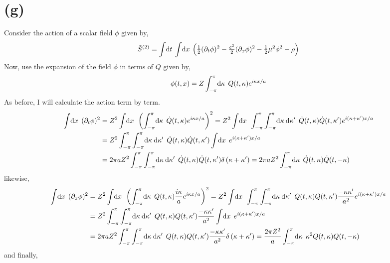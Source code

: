 \documentclass[12pt]{extarticle}
\begin{document}
\section*{(g)}
Consider the action of a scalar field $\phi$ given by,
\[\tilde{S}^{(2)} = \int \! \mathrm{d}t \: \int \! \mathrm{d}x \: \left( \tfrac{1}{2} (\partial_t \phi)^2 - \tfrac{c^2}{2} (\partial_x \phi)^2 - \tfrac{1}{2} \mu^2 \phi^2 - \rho \right)\]
Now, use the expansion of the field $\phi$ in terms of $Q$ given by,
\[\phi(t, x) = Z \int_{-\pi}^{\pi} \! \mathrm{d}\kappa \: \: Q(t, \kappa) e^{i \kappa x / a} \]
As before, I will calculate the action term by term.
\begin{align*}
\int \! \d{x} \: (\partial_t \phi)^2 & = Z^2 \int \! \d{x} \: \left( \int_{-\pi}^{\pi} \! \d{\kappa} \: \dot{Q}(t, \kappa) e^{i \kappa x / a} \right)^2 = Z^2  \int \! \d{x} \:\int_{-\pi}^{\pi} \int_{-\pi}^{\pi} \! \d{\kappa} \d{\kappa'} \: \dot{Q}(t, \kappa) \dot{Q}(t, \kappa') e^{i (\kappa + \kappa') x / a} \\
& = Z^2  \int_{-\pi}^{\pi} \int_{-\pi}^{\pi} \! \d{\kappa} \d{\kappa'} \: \dot{Q}(t, \kappa) \dot{Q}(t, \kappa') \int \! \d{x} \: e^{i (\kappa + \kappa') x / a} \\
& = 2 \pi a Z^2  \int_{-\pi}^{\pi} \int_{-\pi}^{\pi} \! \d{\kappa} \d{\kappa'} \: \dot{Q}(t, \kappa) \dot{Q}(t, \kappa') \delta\left( \kappa + \kappa' \right) = 2 \pi a Z^2  \int_{-\pi}^{\pi} \! \d{\kappa} \: \dot{Q}(t, \kappa) \dot{Q}(t, -\kappa) 
\end{align*}
likewise,
\begin{align*}
\int \! \d{x} \: (\partial_x \phi)^2 & = Z^2 \int \! \d{x} \: \left( \int_{-\pi}^{\pi} \! \d{\kappa} \: Q(t, \kappa) \frac{i \kappa}{a} e^{i \kappa x / a} \right)^2 = Z^2  \int \! \d{x} \:\int_{-\pi}^{\pi} \int_{-\pi}^{\pi} \! \d{\kappa} \d{\kappa'} \: Q(t, \kappa) Q(t, \kappa') \frac{-\kappa \kappa'}{a^2}  e^{i (\kappa + \kappa') x / a} \\
& = Z^2  \int_{-\pi}^{\pi} \int_{-\pi}^{\pi} \! \d{\kappa} \d{\kappa'} \: Q(t, \kappa) Q(t, \kappa') \frac{-\kappa \kappa'}{a^2} \int \! \d{x} \: e^{i (\kappa + \kappa') x / a} \\
& = 2 \pi a Z^2  \int_{-\pi}^{\pi} \int_{-\pi}^{\pi} \! \d{\kappa} \d{\kappa'} \: Q(t, \kappa) Q(t, \kappa') \frac{-\kappa \kappa'}{a^2} \delta\left( \kappa + \kappa' \right) = \frac{2 \pi Z^2}{a}  \int_{-\pi}^{\pi} \! \d{\kappa} \: \kappa^2 Q(t, \kappa) Q(t, -\kappa) 
\end{align*}
and finally,
\end{document}
